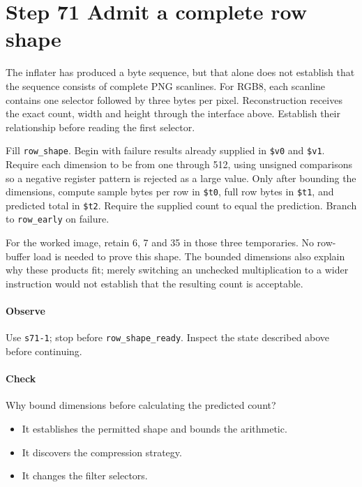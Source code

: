 \section{Step 71 Admit a complete row shape}
The inflater has produced a byte sequence, but that alone does not establish that the sequence consists of complete PNG scanlines. For RGB8, each scanline contains one selector followed by three bytes per pixel. Reconstruction receives the exact count, width and height through the interface above. Establish their relationship before reading the first selector.

Fill \texttt{row\_shape}. Begin with failure results already supplied in \texttt{\$v0} and \texttt{\$v1}. Require each dimension to be from one through 512, using unsigned comparisons so a negative register pattern is rejected as a large value. Only after bounding the dimensions, compute sample bytes per row in \texttt{\$t0}, full row bytes in \texttt{\$t1}, and predicted total in \texttt{\$t2}. Require the supplied count to equal the prediction. Branch to \texttt{row\_early} on failure.

For the worked image, retain 6, 7 and 35 in those three temporaries. No row-buffer load is needed to prove this shape. The bounded dimensions also explain why these products fit; merely switching an unchecked multiplication to a wider instruction would not establish that the resulting count is acceptable.

\paragraph{Observe} Use \texttt{s71-1}; stop before \texttt{row\_shape\_ready}. Inspect the state described above before continuing.

\paragraph{Check} Why bound dimensions before calculating the predicted count?
\begin{itemize}
  \item[A.] It establishes the permitted shape and bounds the arithmetic.
  \item[B.] It discovers the compression strategy.
  \item[C.] It changes the filter selectors.
\end{itemize}
